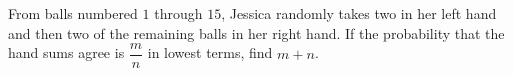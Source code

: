 From balls numbered $1$ through $15$, Jessica randomly takes two in her left hand and then two of the remaining balls in her right hand. If the probability that the hand sums agree is $\dfrac{m}{n}$ in lowest terms, find $m+n$.
